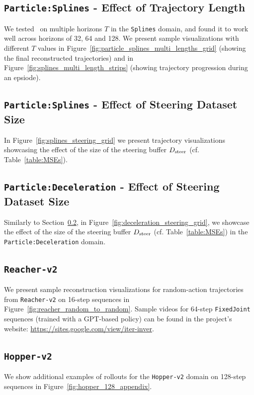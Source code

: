 \documentclass[nohyperref]{article}
\begin{document}
\subsection{\texttt{Particle:Splines} - Effect of Trajectory Length}
\label{app:results_splines_traj_length}
We tested \methodname\ on multiple horizons $T$ in the \texttt{Splines} domain, and found it to work well across horizons of 32, 64 and 128. We present sample visualizations with different $T$ values in Figure~\ref{fig:particle_splines_multi_lengths_grid} (showing the final reconstructed trajectories) and in Figure~\ref{fig:splines_multi_length_strips} (showing trajectory progression during an epsiode).

\subsection{\texttt{Particle:Splines} - Effect of Steering Dataset Size}
\label{app:results_splines_steering_size}
In Figure~\ref{fig:splines_steering_grid} we present trajectory visualizations showcasing the effect of the size of the steering buffer $D_{\mathrm{steer}}$ (cf. Table~\ref{table:MSEs}).


\subsection{\texttt{Particle:Deceleration} - Effect of Steering Dataset Size}
\label{app:results_deceleration}
Similarly to Section~\ref{app:results_splines_steering_size}, in Figure~\ref{fig:deceleration_steering_grid}, we showcase the effect of the size of the steering buffer $D_{\mathrm{steer}}$ (cf. Table~\ref{table:MSEs}) in the \texttt{Particle:Deceleration} domain.

\subsection{\texttt{Reacher-v2}}
We present sample reconstruction visualizations for random-action trajectories from \texttt{Reacher-v2} on 16-step sequences in Figure~\ref{fig:reacher_random_to_random}. Sample videos for 64-step \texttt{FixedJoint} sequences (trained with a GPT-based policy) can be found in the project's website: \url{https://sites.google.com/view/iter-inver}.

\subsection{\texttt{Hopper-v2}}
\label{app:results_hopper}
We show additional examples of rollouts for the \texttt{Hopper-v2} domain on 128-step sequences in Figure~\ref{fig:hopper_128_appendix}. 
\end{document}
